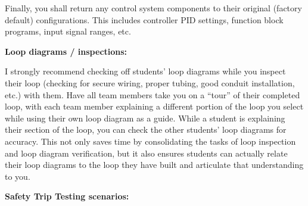 \vskip 10pt

Finally, you shall return any control system components to their original (factory default) configurations.  This includes controller PID settings, function block programs, input signal ranges, etc.















\noindent
{\bf Loop diagrams / inspections:}

I strongly recommend checking off students' loop diagrams while you inspect their loop (checking for secure wiring, proper tubing, good conduit installation, etc.) with them.  Have all team members take you on a ``tour'' of their completed loop, with each team member explaining a different portion of the loop you select while using their own loop diagram as a guide.  While a student is explaining their section of the loop, you can check the other students' loop diagrams for accuracy.  This not only saves time by consolidating the tasks of loop inspection and loop diagram verification, but it also ensures students can actually relate their loop diagrams to the loop they have built and articulate that understanding to you.

\vskip 10pt

\goodbreak

\noindent
{\bf Safety Trip Testing scenarios:}

